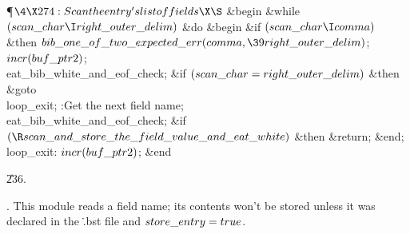 \Y\P$\4\X274:Scan the entry's list of fields\X\S$\6
\&{begin} \&{while} $(\\{scan\_char}\I\\{right\_outer\_delim})$ \1\&{do}\6
\&{begin} \&{if} $(\\{scan\_char}\I\\{comma})$ \1\&{then}\5
$\\{bib\_one\_of\_two\_expected\_err}(\\{comma},\39\\{right\_outer\_delim})$;\2%
\6
$\\{incr}(\\{buf\_ptr2})$;\6
\\{eat\_bib\_white\_and\_eof\_check};\6
\&{if} $(\\{scan\_char}=\\{right\_outer\_delim})$ \1\&{then}\5
\&{goto} \\{loop\_exit};\2\6
:Get the next field name\X;\6
\\{eat\_bib\_white\_and\_eof\_check};\6
\&{if} $(\R\\{scan\_and\_store\_the\_field\_value\_and\_eat\_white})$ \1%
\&{then}\5
\&{return};\2\6
\&{end};\2\6
\4\\{loop\_exit}: $\\{incr}(\\{buf\_ptr2})$;\6
\&{end}\par
\U236.\fi

.
This module reads a field name; its contents won't be stored unless it
was declared in the \.{.bst} file and $\\{store\_entry}=\\{true}$.

